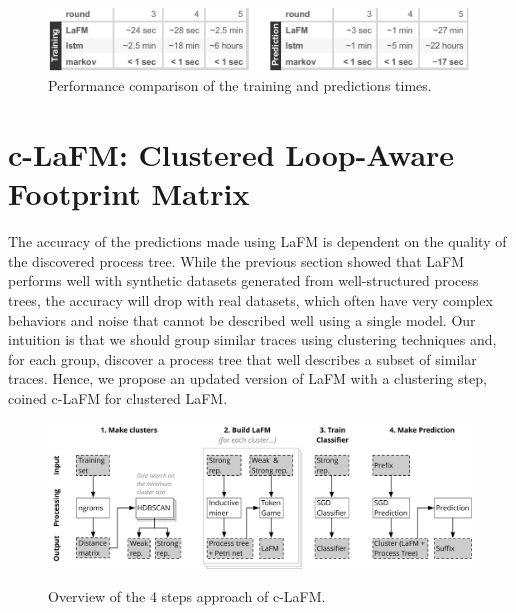 \documentclass[runningheads]{llncs}
\begin{document}
\begin{figure}
\begin{center}
\includegraphics[width=.95\columnwidth]{02-schema/time_synthetic.pdf}
\caption{Performance comparison of the training and predictions times.}
\label{fig:time_synthetic}
\end{center}
\vspace{-20pt}

\end{figure}


\section{c-LaFM: Clustered Loop-Aware Footprint Matrix}

The accuracy of the predictions made using LaFM is dependent on the quality of the discovered process tree. While the previous section showed that LaFM performs well with synthetic datasets generated from well-structured process trees, the accuracy will drop with real datasets, which often have very complex behaviors and noise that cannot be described well using a single model. Our intuition is that we should group similar traces using clustering techniques and, for each group, discover a process tree that well describes a subset of similar traces. Hence, we propose an updated version of LaFM with a clustering step, coined c-LaFM for clustered LaFM.


\begin{figure}
\begin{center}
\includegraphics[width=1\columnwidth]{02-schema/LaFM_details.pdf}
\label{fig:LaFM_details}
\caption{Overview of the 4 steps approach of c-LaFM.}
\end{center}
\end{figure}
\end{document}
